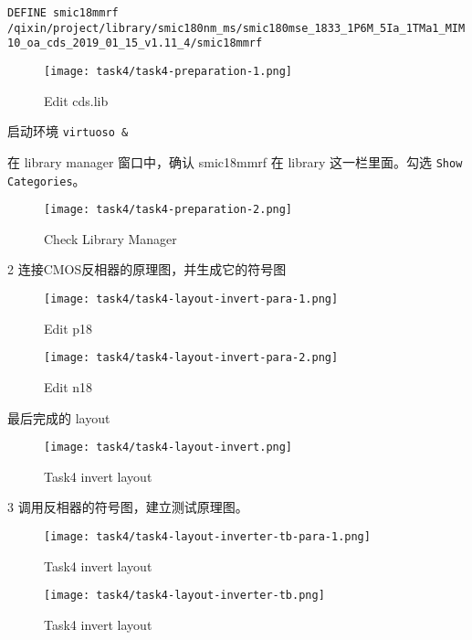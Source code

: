 \documentclass{theme-2614084}
\begin{document}
\texttt{DEFINE smic18mmrf /qixin/project/library/smic180nm\_ms/smic180mse\_1833\_1P6M\_5Ia\_1TMa1\_MIM10\_oa\_cds\_2019\_01\_15\_v1.11\_4/smic18mmrf}

\begin{figure}[H]
  \centering
  \texttt{[image: task4/task4-preparation-1.png]}
  \caption{Edit cds.lib}
\end{figure}

启动环境 \texttt{virtuoso \&}

在 library manager 窗口中，确认 smic18mmrf 在 library 这一栏里面。勾选 \texttt{Show Categories}。

\begin{figure}[H]
  \centering
  \texttt{[image: task4/task4-preparation-2.png]}
  \caption{Check Library Manager}
\end{figure}

2 连接CMOS反相器的原理图，并生成它的符号图

\begin{figure}[htbp]
  \centering\begin{minipage}[t]{0.48\textwidth}
    \centering\texttt{[image: task4/task4-layout-invert-para-1.png]}
    \caption{Edit p18}
  \end{minipage}
  \centering\begin{minipage}[t]{0.48\textwidth}
    \centering\texttt{[image: task4/task4-layout-invert-para-2.png]}
    \caption{Edit n18}
  \end{minipage}
\end{figure}

最后完成的 layout

\begin{figure}[H]
  \centering
  \texttt{[image: task4/task4-layout-invert.png]}
  \caption{Task4 invert layout}
\end{figure}

3 调用反相器的符号图，建立测试原理图。

\begin{figure}[H]
  \centering
  \texttt{[image: task4/task4-layout-inverter-tb-para-1.png]}
  \caption{Task4 invert layout}
\end{figure}

\begin{figure}[H]
  \centering
  \texttt{[image: task4/task4-layout-inverter-tb.png]}
  \caption{Task4 invert layout}
\end{figure}
\end{document}
